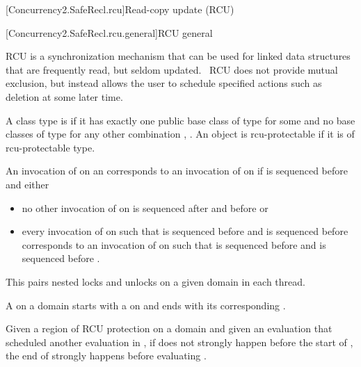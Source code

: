 
[Concurrency2.SafeRecl.rcu]{Read-copy update (RCU)}

[Concurrency2.SafeRecl.rcu.general]{RCU general}

\pnum
RCU is a synchronization mechanism that can be used for linked data
structures that are frequently read, but seldom updated.  RCU does
not provide mutual exclusion, but instead allows the user to schedule
specified actions such as deletion at some later time.

\pnum
A class type  is  if it has exactly one
public base class of type  for some 
and no base classes of type  for any other
combination , . An object is rcu-protectable if it is
of rcu-protectable type.

\pnum
An invocation of  on an  corresponds
to an invocation of  on  if  is
sequenced before  and either

\begin{itemize}
\item	no other invocation of  on  is sequenced
	after  and before  or
\item	every invocation of  on  such
	that  is sequenced before  and 
	is sequenced before  corresponds to an invocation of
	 on  such that  is sequenced
	before  and  is sequenced before .
\end{itemize}


\pnum
\begin{note}
This pairs nested locks and unlocks on a given domain in each thread.
\end{note}

\pnum
A  on a domain  starts
with a  on  and ends with its corresponding
.

\pnum
Given a region of RCU protection  on a domain 
and given an evaluation  that scheduled another evaluation
 in , if  does not strongly happen before
the start of , the end of  strongly happens before
evaluating .

